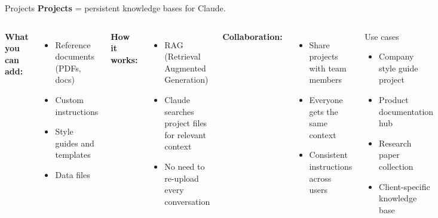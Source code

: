 \documentclass[aspectratio=169]{beamer}
\begin{document}
\begin{frame}{Projects}
\textbf{Projects} = persistent knowledge bases for Claude.

\bigskip
\begin{columns}[T]
\textbf{What you can add:}
\begin{itemize}
  \item Reference documents (PDFs, docs)
  \item Custom instructions
  \item Style guides and templates
  \item Data files
\end{itemize}

\bigskip
\textbf{How it works:}
\begin{itemize}
  \item RAG (Retrieval Augmented Generation)
  \item Claude searches project files for relevant context
  \item No need to re-upload every conversation
\end{itemize}

\textbf{Collaboration:}
\begin{itemize}
  \item Share projects with team members
  \item Everyone gets the same context
  \item Consistent instructions across users
\end{itemize}

\bigskip
\begin{exampleblock}{Use cases}
\begin{itemize}
  \item Company style guide project
  \item Product documentation hub
  \item Research paper collection
  \item Client-specific knowledge base
\end{itemize}
\end{exampleblock}
\end{columns}
\end{frame}
\end{document}
